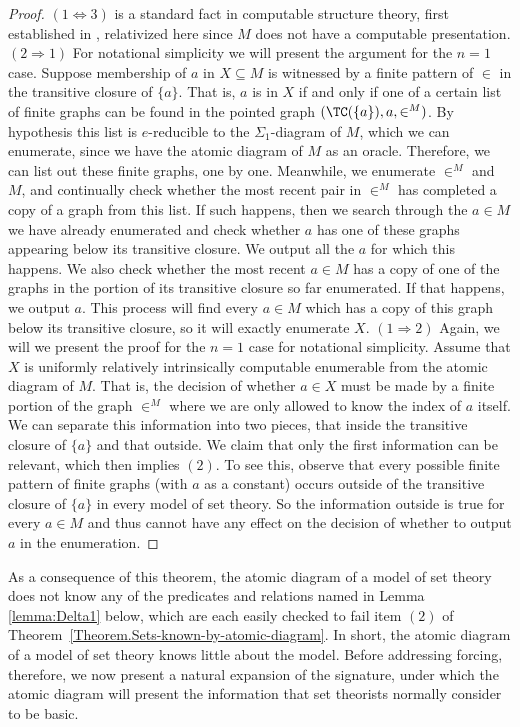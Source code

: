 \documentclass{amsart}
\begin{document}
\begin{proof}
$(1 \Leftrightarrow 3)$ is a standard fact in computable structure theory, first established in \cite{AKMS},
relativized here since $M$ does not have a computable presentation.
$(2 \Rightarrow 1)$ For notational simplicity we will present the argument for the $n = 1$ case. Suppose membership of $a$ in $X \subseteq M$ is witnessed by a finite pattern of $\in$ in the transitive closure of $\{a\}$. That is, $a$ is in $X$ if and only if one of a certain list of finite graphs can be found in the pointed graph $(\TC(\{a\}),a,\in^M)$. By hypothesis
this list is $e$-reducible to the $\Sigma_1$-diagram of $M$, which we can enumerate,
since we have the atomic diagram of $M$ as an oracle.
Therefore, we can list out these finite graphs,
one by one.
Meanwhile, we enumerate $\in^M$ and $M$, and continually check whether the most recent pair in $\in^M$ has completed a copy of a graph from this list. If such happens, then we search through the $a \in M$ we have already enumerated and check whether $a$ has one of these graphs appearing below its transitive closure. We output all the $a$ for which this happens. We also check whether the most recent $a \in M$ has a copy of one of the graphs in the portion of its transitive closure so far enumerated. If that happens, we output $a$. This process will find every $a \in M$ which has a copy of this graph below its transitive closure, so it will exactly enumerate $X$.
$(1 \Rightarrow 2)$ Again, we will we present the proof for the $n = 1$ case for notational simplicity. Assume that $X$ is uniformly relatively intrinsically computable enumerable from the atomic diagram of $M$. That is, the decision of whether $a \in X$ must be made by a finite portion of the graph $\in^M$ where we are only allowed to know the index of $a$ itself. We can separate this information into two pieces, that inside the transitive closure of $\{a\}$ and that outside. We claim that only the first information can be relevant, which then implies $(2)$. To see this, observe that every possible finite pattern of finite graphs (with $a$ as a constant) occurs outside of the transitive closure of $\{a\}$ in every model of set theory. So the information outside is true for every $a \in M$ and thus cannot have any effect on the decision of whether to output $a$ in the enumeration.
\end{proof}
As a consequence of this theorem, the atomic diagram of a model of set theory does not know any of the predicates
and relations named in Lemma \ref{lemma:Delta1} below, which are each easily checked to fail item $(2)$ of Theorem~\ref{Theorem.Sets-known-by-atomic-diagram}.
In short, the atomic diagram of a model of set theory knows little about the model.
Before addressing forcing, therefore, we now present a natural expansion of the signature,
under which the atomic diagram will present the information that set theorists normally consider to be basic.
\end{document}
